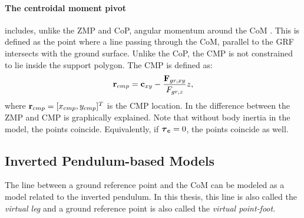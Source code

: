 \paragraph{The centroidal moment pivot} includes, unlike the \ac{ZMP} and \ac{CoP}, angular momentum around the \ac{CoM}  \cite{popovic2005ground}. This is defined as the point where a line passing through the \ac{CoM}, parallel to the \ac{GRF} intersects with the ground surface. Unlike the \ac{CoP}, the \ac{CMP} is not constrained to lie inside the support polygon. The \ac{CMP} is defined as:
\begin{equation}
    \mathbf{r}_{cmp}=\mathbf{c}_{xy}-\frac{\mathbf{F}_{gr,xy}}{F_{gr,z}}z,
    \label{eq:cmp}
\end{equation}
where $\mathbf{r}_{cmp} =[x_{cmp}, y_{cmp}]^T$ is the \ac{CMP} location. In  the difference between the \ac{ZMP} and \ac{CMP} is graphically explained. Note that without body inertia in the model, the points coincide. Equivalently, if $\boldsymbol{\tau}_{\mathbf{c}}=0$, the points coincide as well.

\subsection{Inverted Pendulum-based Models}
The line between a ground reference point and the \ac{CoM} can be modeled as a model related to the inverted pendulum. In this thesis, this line is also called the \textit{virtual leg} and a ground reference point is also called the \textit{virtual point-foot}.

